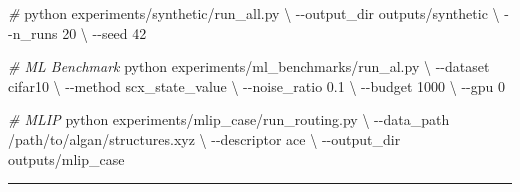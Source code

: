 \documentclass[
  12pt,
]{article}
\newenvironment{Shaded}{}{}
\newcommand{\AttributeTok}[1]{\textcolor[rgb]{0.49,0.56,0.16}{#1}}
\newcommand{\CommentTok}[1]{\textcolor[rgb]{0.38,0.63,0.69}{\textit{#1}}}
\newcommand{\DataTypeTok}[1]{\textcolor[rgb]{0.56,0.13,0.00}{#1}}
\newcommand{\ExtensionTok}[1]{#1}
\newcommand{\NormalTok}[1]{#1}
\begin{document}
\begin{Shaded}
\begin{Highlighting}[]
\CommentTok{\# }
\ExtensionTok{python}\NormalTok{ experiments/synthetic/run\_all.py }\DataTypeTok{\textbackslash{}}
    \AttributeTok{{-}{-}output\_dir}\NormalTok{ outputs/synthetic }\DataTypeTok{\textbackslash{}}
    \AttributeTok{{-}{-}n\_runs}\NormalTok{ 20 }\DataTypeTok{\textbackslash{}}
    \AttributeTok{{-}{-}seed}\NormalTok{ 42}

\CommentTok{\#  ML Benchmark }
\ExtensionTok{python}\NormalTok{ experiments/ml\_benchmarks/run\_al.py }\DataTypeTok{\textbackslash{}}
    \AttributeTok{{-}{-}dataset}\NormalTok{ cifar10 }\DataTypeTok{\textbackslash{}}
    \AttributeTok{{-}{-}method}\NormalTok{ scx\_state\_value }\DataTypeTok{\textbackslash{}}
    \AttributeTok{{-}{-}noise\_ratio}\NormalTok{ 0.1 }\DataTypeTok{\textbackslash{}}
    \AttributeTok{{-}{-}budget}\NormalTok{ 1000 }\DataTypeTok{\textbackslash{}}
    \AttributeTok{{-}{-}gpu}\NormalTok{ 0}

\CommentTok{\# MLIP }
\ExtensionTok{python}\NormalTok{ experiments/mlip\_case/run\_routing.py }\DataTypeTok{\textbackslash{}}
    \AttributeTok{{-}{-}data\_path}\NormalTok{ /path/to/algan/structures.xyz }\DataTypeTok{\textbackslash{}}
    \AttributeTok{{-}{-}descriptor}\NormalTok{ ace }\DataTypeTok{\textbackslash{}}
    \AttributeTok{{-}{-}output\_dir}\NormalTok{ outputs/mlip\_case}
\end{Highlighting}
\end{Shaded}

\begin{center}\rule{0.5\linewidth}{0.5pt}\end{center}

\subsection{}\label{ux9644ux5f55ux5173ux952eux7b26ux53f7ux5bf9ux7167ux8868}
\end{document}
